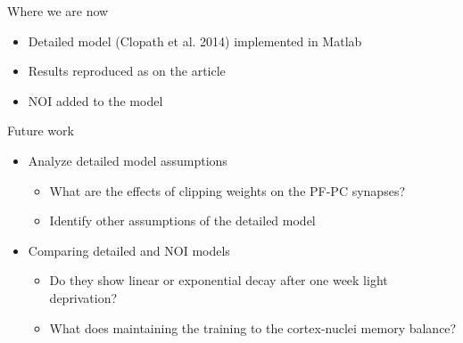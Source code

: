 \documentclass[ignorenonframetext,]{beamer}
\begin{document}
\begin{frame}{Where we are now}

\begin{itemize}
\itemsep1pt\parskip0pt
\item
  Detailed model (Clopath et al. 2014) implemented in Matlab
\item
  Results reproduced as on the article
\item
  NOI added to the model
\end{itemize}

\end{frame}

\begin{frame}{Future work}

\begin{itemize}
\itemsep1pt\parskip0pt
\item
  Analyze detailed model assumptions

  \begin{itemize}
  \itemsep1pt\parskip0pt
  \item
    What are the effects of clipping weights on the PF-PC synapses?
  \item
    Identify other assumptions of the detailed model
  \end{itemize}
\item
  Comparing detailed and NOI models

  \begin{itemize}
  \itemsep1pt\parskip0pt
  \item
    Do they show linear or exponential decay after one week light
    deprivation?
  \item
    What does maintaining the training to the cortex-nuclei memory
    balance?
  \end{itemize}
\end{itemize}

\end{frame}
\end{document}
